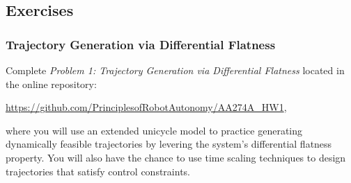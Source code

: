 \subsection{Exercises}
\subsubsection{Trajectory Generation via Differential Flatness}
Complete \textit{Problem 1:  Trajectory Generation via Differential Flatness} located in the online repository:

\vspace{\baselineskip}

\url{https://github.com/PrinciplesofRobotAutonomy/AA274A_HW1},

\vspace{\baselineskip}

where you will use an extended unicycle model to practice generating dynamically feasible trajectories by levering the system's differential flatness property. You will also have the chance to use time scaling techniques to design trajectories that satisfy control constraints.

 


